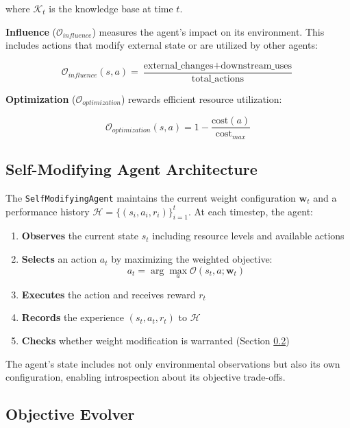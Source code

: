 \documentclass{article}
\begin{document}
where $\mathcal{K}_t$ is the knowledge base at time $t$.

\textbf{Influence} ($\mathcal{O}_{influence}$) measures the agent's impact on its environment. This includes actions that modify external state or are utilized by other agents:

\begin{equation}
\mathcal{O}_{influence}(s, a) = \frac{\text{external\_changes} + \text{downstream\_uses}}{\text{total\_actions}}
\end{equation}

\textbf{Optimization} ($\mathcal{O}_{optimization}$) rewards efficient resource utilization:

\begin{equation}
\mathcal{O}_{optimization}(s, a) = 1 - \frac{\text{cost}(a)}{\text{cost}_{max}}
\end{equation}

\subsection{Self-Modifying Agent Architecture}

The \texttt{SelfModifyingAgent} maintains the current weight configuration $\mathbf{w}_t$ and a performance history $\mathcal{H} = \{(s_i, a_i, r_i)\}_{i=1}^t$. At each timestep, the agent:

\begin{enumerate}
    \item \textbf{Observes} the current state $s_t$ including resource levels and available actions
    \item \textbf{Selects} an action $a_t$ by maximizing the weighted objective:
    \begin{equation}
    a_t = \arg\max_a \mathcal{O}(s_t, a; \mathbf{w}_t)
    \end{equation}
    \item \textbf{Executes} the action and receives reward $r_t$
    \item \textbf{Records} the experience $(s_t, a_t, r_t)$ to $\mathcal{H}$
    \item \textbf{Checks} whether weight modification is warranted (Section \ref{sec:evolver})
\end{enumerate}

The agent's state includes not only environmental observations but also its own configuration, enabling introspection about its objective trade-offs.

\subsection{Objective Evolver}
\label{sec:evolver}
\end{document}
